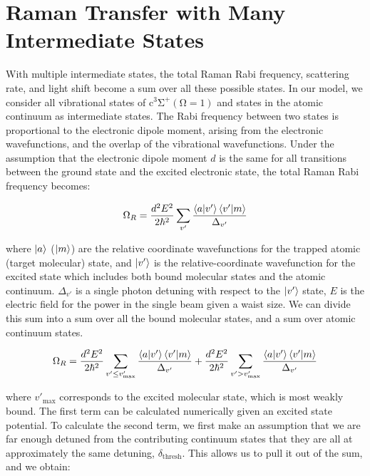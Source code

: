 \documentclass[aps,secnumarabic,amsmath,amssymb,superscriptaddress]{revtex4}
\begin{document}
\section{Raman Transfer with Many Intermediate States} \label{sm:sect_2}
With multiple intermediate states, the total Raman Rabi frequency, scattering rate, and light shift become a sum over all these possible states. In our model, we consider all vibrational states of $ \mathrm{c^3\Sigma^+(\Omega = 1)} $ and states in the atomic continuum as intermediate states. The Rabi frequency between two states is proportional to the electronic dipole moment, arising from the electronic wavefunctions, and the overlap of the vibrational wavefunctions. Under the assumption that the electronic dipole moment $ d $ is the same for all transitions between the ground state and the excited electronic state, the total Raman Rabi frequency becomes:

\begin{equation}
  \Omega_R = \frac{d^2E^2}{2\hbar^2} \displaystyle\sum_{v'} \frac{\braket{a|v'}\braket{v'|m}}{\Delta_{v'}}
\end{equation}

where $\ket{a}$ ($\ket{m}$) are the relative coordinate wavefunctions for the trapped atomic (target molecular) state, and $\ket{v'}$ is the relative-coordinate wavefunction for the excited state which includes both bound molecular states and the atomic continuum. $\Delta_{v'}$ is a single photon detuning with respect to the $\ket{v'}$ state, $ E $ is the electric field for the power in the single beam given a waist size. We can divide this sum into a sum over all the bound molecular states, and a sum over atomic continuum states.

\begin{equation}
  \Omega_R = \frac{d^2E^2}{2\hbar^2}\displaystyle\sum_{v' \leq v'_{\text{max}}} \frac{\braket{a|v'}\braket{v'|m}}{\Delta_{v'}} +  \frac{d^2E^2}{2\hbar^2}\displaystyle\sum_{v' > v'_{\text{max}}} \frac{\braket{a|v'}\braket{v'|m}}{\Delta_{v'}}
\end{equation}

where $ v'_{\text{max}}$ corresponds to the excited molecular state, which is most weakly bound. The first term can be calculated numerically given an excited state potential. To calculate the second term, we first make an assumption that we are far enough detuned from the contributing continuum states that they are all at approximately the same detuning, $ \delta_{\text{thresh}}$. This allows us to pull it out of the sum, and we obtain:
\end{document}
